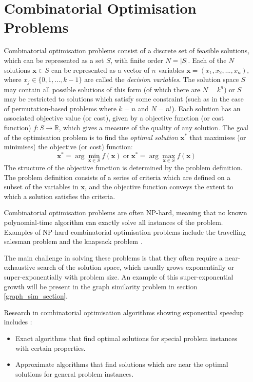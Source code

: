 \section{Combinatorial Optimisation Problems}\label{sec:cop}
Combinatorial optimisation problems consist of a discrete set of feasible solutions, which can be represented as a set $S$, with finite order $N=|S|$. Each of the $N$ solutions $\mathbf{x} \in S$ can be represented as a vector of $n$ variables $\mathbf{x}=(x_1, x_2,...,x_n)$, where $x_j\in\{0,1,...,k-1\}$ are called the \textit{decision variables}. The solution space $S$ may contain all possible solutions of this form (of which there are $N=k^n$) or $S$ may be restricted to solutions which satisfy some constraint (such as in the case of permutation-based problems where $k=n$ and $N=n!$). Each solution has an associated objective value (or cost), given by a objective function (or cost function) $f:S\rightarrow\mathbb{R}$, which gives a measure of the quality of any solution. The goal of the optimisation problem is to find the \textit{optimal solution} $\mathbf{x}^*$ that maximises (or minimises) the objective (or cost) function:
$$\mathbf{x}^* = \arg\min_{\mathbf{x} \in S} f(\mathbf{x})
\;\text{or}\;
\mathbf{x}^* = \arg\max_{\mathbf{x} \in S} f(\mathbf{x})$$
The structure of the objective function is determined by the problem definition. The problem definition consists of a series of criteria which are defined on a subset of the variables in $\mathbf{x}$, and the objective function conveys the extent to which a solution satisfies the criteria.

Combinatorial optimisation problems are often NP-hard, meaning that no known polynomial-time algorithm can exactly solve all instances of the problem. Examples of NP-hard combinatorial optimisation problems include the travelling salesman problem \cite{QUBO-traveling} and the knapsack problem \cite{knap-sack}.

The main challenge in solving these problems is that they often require a near-exhaustive search of the solution space, which usually grows exponentially or super-exponentially with problem size. An example of this super-exponential growth will be present in the graph similarity problem in section \ref{graph_sim_section}.

Research in combinatorial optimisation algorithms showing exponential speedup includes \cite{thoughts-graphsimilarity}:
\begin{itemize}
    \item Exact algorithms that find optimal solutions for special problem instances with certain properties. 
    \item Approximate algorithms that find solutions which are near the optimal solutions for general problem instances.
\end{itemize}

